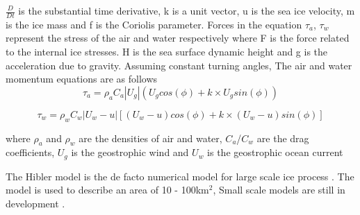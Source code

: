 $\frac{D}{Dt}$ is the substantial time derivative, k is a unit vector, u is the sea ice velocity, m is the ice mass and f is the Coriolis parameter. Forces in the equation $\tau_a$, $\tau_w$ represent the stress of the air and water respectively where F is the force related to the internal ice stresses. H is the sea surface dynamic height and g is the acceleration due to gravity. Assuming constant turning angles, The air and water momentum equations are as follows
\begin{equation}
    \tau_a = \rho_a C_a|U_g|(U_g cos(\phi)+k\times U_g sin(\phi))
\end{equation}

\begin{equation}
    \tau_w = \rho_w C_w|U_w-u|[(U_w-u)cos(\phi)+k\times(U_w-u)sin(\phi)]
\end{equation}


where $\rho_a $ and $\rho_w$ are the densities of air and water, $C_a$/$C_w$ are the drag coefficients, $U_g$ is the geostrophic wind and $U_w$ is the geostrophic ocean current\par

The Hibler model is the de facto numerical model for large scale ice process \cite{Rutgher2019SmallScale}. The model is used to describe an area of 10 - 100km$^2$, Small scale models are still in development \cite{Rutgher2019SmallScale}.\par 

